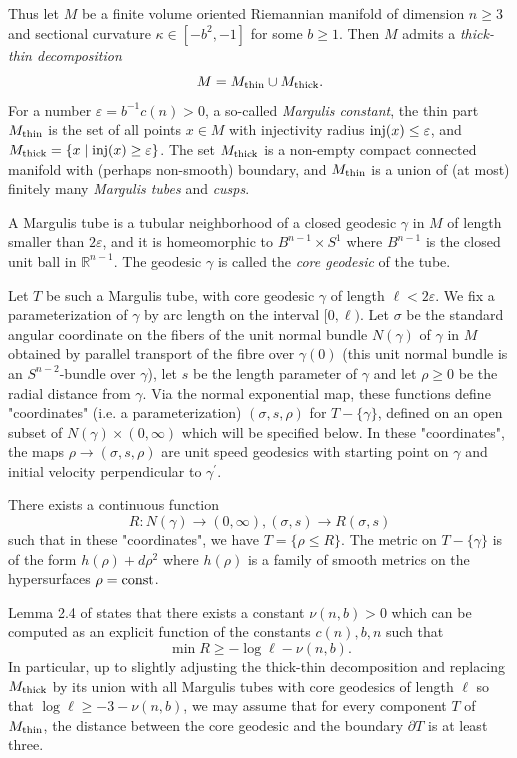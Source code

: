 \documentclass[11pt]{amsart}
\theoremstyle{plain}
\theoremstyle{plain}
\theoremstyle{definition}
\renewcommand{\epsilon}{\varepsilon}
\begin{document}
Thus let $M$ be a finite volume oriented Riemannian 
manifold of dimension $n\geq 3$
and sectional curvature $\kappa\in [-b^2,-1]$ for some 
$b\geq 1$.  
Then $M$ admits a \emph{thick-thin decomposition}
\[M=M_{\rm thin}\cup M_{\rm thick}.\]
For a number $\epsilon=b^{-1}c(n)>0$, a so-called \emph{Margulis constant}, 
the thin part $M_{\rm thin}$ is the set of all 
points $x\in M$ with injectivity
radius ${\rm inj}(x)\leq  \epsilon$,
and $M_{\rm thick}=\{x\mid {\rm inj}(x)\geq \epsilon\}$.
The set 
$M_{\rm thick}$ is a non-empty 
compact connected manifold with (perhaps non-smooth) boundary, and  
$M_{\rm thin}$ is a union of (at most) finitely many 
\emph{Margulis tubes} and \emph{cusps}. 


A Margulis tube is a tubular neighborhood of a closed geodesic
$\gamma$ in $M$ of length smaller than $2\epsilon$, and it is 
homeomorphic to $B^{n-1}\times S^1$
where $B^{n-1}$ is the closed unit ball in $\mathbb{R}^{n-1}$.
The geodesic $\gamma$ 
is called the \emph{core geodesic} of the tube. 

Let $T$ be such a Margulis tube, with core geodesic $\gamma$
of length $\ell<2\epsilon$. 
We fix a parameterization of $\gamma$ by arc length on the interval
$[0,\ell)$. 
Let $\sigma$ be the standard angular coordinate on the fibers of the 
unit normal bundle $N(\gamma)$ 
of $\gamma$ in $M$ obtained by parallel transport of 
the fibre over $\gamma(0)$  
(this unit normal bundle is an $S^{n-2}$-bundle
over $\gamma$), let $s$ be the length parameter
of $\gamma$ and let $\rho\geq 0$ be the radial distance from $\gamma$.
Via the normal exponential map, these functions define 
"coordinates" (i.e. a parameterization) $(\sigma,s,\rho)$ for $T-\{\gamma\}$,
defined on an open subset of $N(\gamma)\times (0,\infty)$
which will be specified below. 
In these "coordinates",
the maps $\rho\to (\sigma, s, \rho)$ are unit speed geodesics 
with starting point on $\gamma$ and initial velocity
perpendicular to $\gamma^\prime$.

There exists a continuous function 
\[R:N(\gamma)\to (0,\infty), (\sigma,s)\to R(\sigma,s)\]
such that in these "coordinates", we have
$T=\{\rho\leq R\}$. The metric on $T-\{\gamma\}$ is 
of the form
$h(\rho) +d\rho^2$ where $h(\rho)$ 
is a family of smooth metrics on the hypersurfaces $\rho={\rm const}$.

Lemma 2.4 of \cite{BCD93} states that there exists a constant
$\nu(n,b)>0$ which can be computed as an explicit function 
of the constants $c(n), b,n$ such that
\begin{equation}\label{mincontrol}
\min R\geq -\log \ell -\nu(n,b).\end{equation}
In particular, up to slightly adjusting the thick-thin decomposition
and replacing $M_{\rm thick}$  
by its union with all Margulis tubes with core geodesics of length
$\ell$ so that $\log \ell\geq -3-\nu(n,b)$, 
we may assume that 
for every component $T$ of $M_{\rm thin}$, the distance between
the core geodesic and the boundary $\partial T$ is at least three. 
\end{document}
